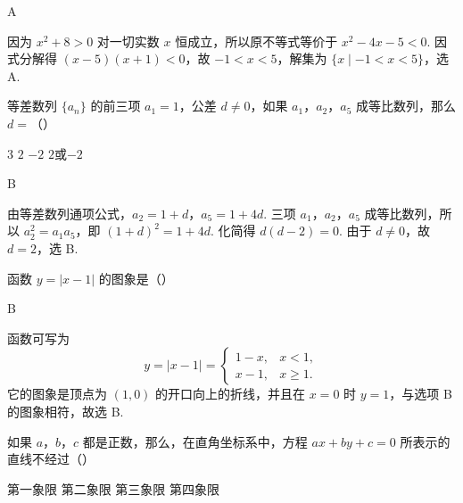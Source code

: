 \begin{answer}
A
\end{answer}

\begin{solution}
因为 \(x^2+8>0\) 对一切实数 \(x\) 恒成立，所以原不等式等价于 \(x^2-4x-5<0\). 因式分解得 \((x-5)(x+1)<0\)，故 \(-1<x<5\)，解集为 \(\{x\mid-1<x<5\}\)，选 A.
\end{solution}

\begin{problem}
等差数列 \(\{a_n\}\) 的前三项 \(a_1=1\)，公差 \(d\neq0\)，如果 \(a_1\)，\(a_2\)，\(a_5\) 成等比数列，那么 \(d=\)（\quad）

\choices
    {\(3\)}
    {\(2\)}
    {\(-2\)}
    {\(2\)或\(-2\)}
\end{problem}

\begin{answer}
B
\end{answer}

\begin{solution}
由等差数列通项公式，\(a_2=1+d\)，\(a_5=1+4d\). 三项 \(a_1\)，\(a_2\)，\(a_5\) 成等比数列，所以 \(a_2^2=a_1a_5\)，即 \((1+d)^2=1+4d\). 化简得 \(d(d-2)=0\). 由于 \(d\neq0\)，故 \(d=2\)，选 B.
\end{solution}

\begin{problem}
函数 \(y=|x-1|\) 的图象是（\quad）

    {}
    {}
    {}
\end{problem}

\begin{answer}
B
\end{answer}

\begin{solution}
函数可写为
\[
y=|x-1|=\begin{cases}
1-x,&x<1,\\
x-1,&x\geqslant1.
\end{cases}
\]
它的图象是顶点为 \((1,0)\) 的开口向上的折线，并且在 \(x=0\) 时 \(y=1\)，与选项 B 的图象相符，故选 B.
\end{solution}

\begin{problem}
如果 \(a\)，\(b\)，\(c\) 都是正数，那么，在直角坐标系中，方程 \(ax+by+c=0\) 所表示的直线不经过（\quad）

\choices
    {第一象限}
    {第二象限}
    {第三象限}
    {第四象限}
\end{problem}

